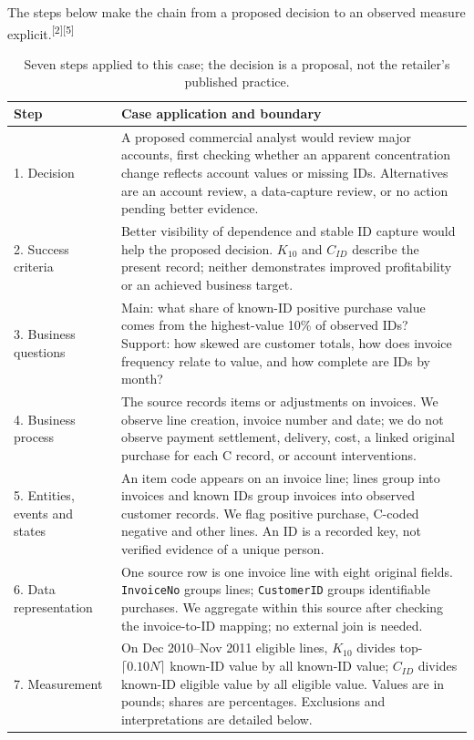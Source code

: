 \documentclass[10pt,a4paper]{article}
\newcommand{\subhead}[1]{\vspace{0.15em}{\bfseries #1}\par}
\newcommand{\source}[1]{\textsuperscript{[#1]}}
\begin{document}
\subhead{Seven-step map from Class 03}
The steps below make the chain from a proposed decision to an observed measure explicit.\source{2}\source{5}
\begin{table}[H]\centering\small
\caption{Seven steps applied to this case; the decision is a proposal, not the retailer's published practice.}
\begin{tabularx}{\linewidth}{@{}p{2.65cm}X@{}}\toprule
Step & Case application and boundary \\\midrule
1. Decision & A proposed commercial analyst would review major accounts, first checking whether an apparent concentration change reflects account values or missing IDs. Alternatives are an account review, a data-capture review, or no action pending better evidence. \\
2. Success criteria & Better visibility of dependence and stable ID capture would help the proposed decision. $K_{10}$ and $C_{ID}$ describe the present record; neither demonstrates improved profitability or an achieved business target. \\
3. Business questions & Main: what share of known-ID positive purchase value comes from the highest-value 10\% of observed IDs? Support: how skewed are customer totals, how does invoice frequency relate to value, and how complete are IDs by month? \\
4. Business process & The source records items or adjustments on invoices. We observe line creation, invoice number and date; we do not observe payment settlement, delivery, cost, a linked original purchase for each C record, or account interventions. \\
5. Entities, events and states & An item code appears on an invoice line; lines group into invoices and known IDs group invoices into observed customer records. We flag positive purchase, C-coded negative and other lines. An ID is a recorded key, not verified evidence of a unique person. \\
6. Data representation & One source row is one invoice line with eight original fields. \texttt{InvoiceNo} groups lines; \texttt{CustomerID} groups identifiable purchases. We aggregate within this source after checking the invoice-to-ID mapping; no external join is needed. \\
7. Measurement & On Dec 2010--Nov 2011 eligible lines, $K_{10}$ divides top-$\lceil0.10N\rceil$ known-ID value by all known-ID value; $C_{ID}$ divides known-ID eligible value by all eligible value. Values are in pounds; shares are percentages. Exclusions and interpretations are detailed below. \\
\bottomrule\end{tabularx}
\end{table}
\end{document}
